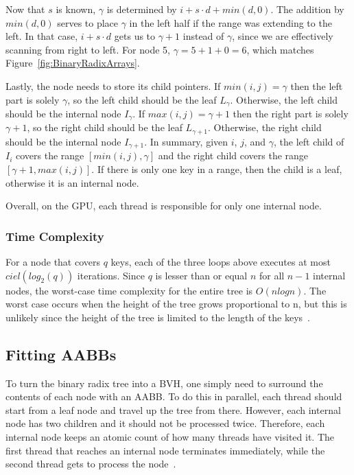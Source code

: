 \documentclass{sig-alternate}
\begin{document}
Now that $s$ is known, $\gamma$ is determined by $i + s \cdot d + min(d, 0)$. The  addition by $min(d, 0)$ serves to place $\gamma$ in the left half if the range was extending to the left. In that case, $i + s \cdot d$ gets us to $\gamma + 1$ instead of $\gamma$, since we are effectively scanning from right to left. For node 5, $\gamma=5+1+0=6$, which matches Figure~\ref{fig:BinaryRadixArrays}.

Lastly, the node needs to store its child pointers. If $min(i,j)=\gamma$ then the left part is solely $\gamma$, so the left child should be the leaf $L_{\gamma}$. Otherwise, the left child should be the internal node $I_{\gamma}$. If $max(i,j)=\gamma+1$ then the right  part is solely $\gamma+1$, so the right child should be the leaf $L_{\gamma+1}$. Otherwise, the right child should be the internal node $I_{\gamma+1}$. In summary, given $i$, $j$, and $\gamma$, the left child of $I_i$ covers the range $[min(i,j), \gamma]$ and the right child covers the range $[\gamma+1,max(i,j)]$. If there is only one key in a range, then the child is a leaf, otherwise it is an internal node.

Overall, on the GPU, each thread is responsible for only one internal node.

\subsubsection{Time Complexity}
\label{sec:time}

For a node that covers $q$ keys, each of the three loops above executes at most $ciel(log_{2}(q))$ iterations. Since $q$ is lesser than or equal $n$ for all $n-1$ internal nodes, the worst-case time complexity for the entire tree is $O(n log n)$. The worst case occurs when the height of the tree grows proportional to n, but this is unlikely since the height of the tree is limited to the length of the keys~\cite{Karras:2012}.

\subsection{Fitting AABBs}
\label{sec:fitting}

To turn the binary radix tree into a BVH, one simply need to surround the contents of each node with an AABB. To do this in parallel, each thread should start from a leaf node and travel up the tree from there. However, each internal node has two children and it should not be processed twice. Therefore, each internal node keeps an atomic count of how many threads have visited it. The first thread that reaches an internal node terminates immediately, while the second thread gets to process the node~\cite{Karras:2012}.
\end{document}
